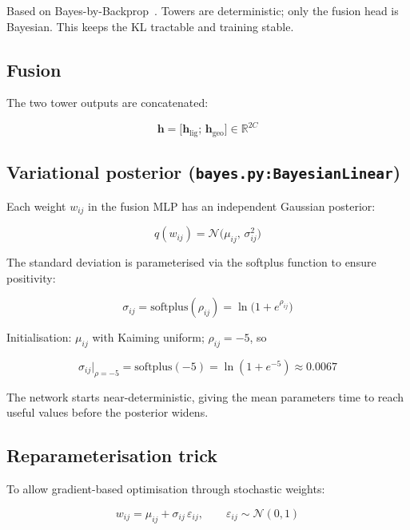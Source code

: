 \documentclass[11pt,a4paper]{article}
\newcommand{\R}{\mathbb{R}}
\newcommand{\bh}{\mathbf{h}}
\newcommand{\softplus}{\mathrm{softplus}}
\newcommand{\code}[1]{\texttt{#1}}
\begin{document}
Based on Bayes-by-Backprop~\cite{blundell2015}.  Towers are deterministic;
only the fusion head is Bayesian.  This keeps the KL tractable and training stable.

\subsection{Fusion}

The two tower outputs are concatenated:

\begin{equation}
\mathbf{h} = \bigl[\bh_{\mathrm{lig}};\, \bh_{\mathrm{geo}}\bigr] \in \R^{2C}
\end{equation}

\subsection{Variational posterior (\code{bayes.py:BayesianLinear})}

Each weight $w_{ij}$ in the fusion MLP has an independent Gaussian posterior:

\begin{equation}
q(w_{ij}) = \mathcal{N}\!\bigl(\mu_{ij},\, \sigma_{ij}^2\bigr)
\end{equation}

The standard deviation is parameterised via the softplus function to ensure
positivity:

\begin{equation}
\sigma_{ij} = \softplus(\rho_{ij}) = \ln\!\bigl(1 + e^{\rho_{ij}}\bigr)
\label{eq:softplus}
\end{equation}

Initialisation: $\mu_{ij}$ with Kaiming uniform; $\rho_{ij} = -5$, so

\begin{equation}
\sigma_{ij}\big|_{\rho=-5}
= \softplus(-5) = \ln(1 + e^{-5}) \approx 0.0067
\end{equation}

The network starts near-deterministic, giving the mean parameters time to reach
useful values before the posterior widens.

\subsection{Reparameterisation trick}

To allow gradient-based optimisation through stochastic weights:

\begin{equation}
w_{ij} = \mu_{ij} + \sigma_{ij}\,\varepsilon_{ij},
\qquad
\varepsilon_{ij} \sim \mathcal{N}(0, 1)
\label{eq:reparam}
\end{equation}
\end{document}
